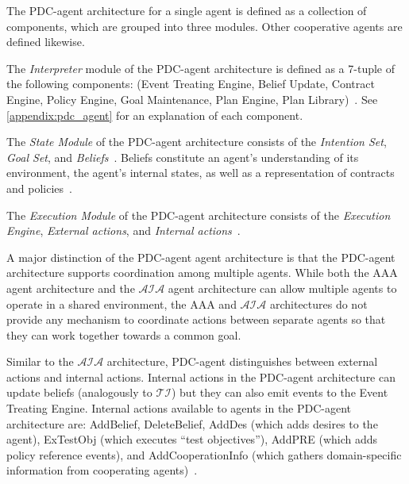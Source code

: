 \begin{definition}
    The PDC-agent architecture for a single agent is defined as a collection of components, which are grouped into three modules\footnotemark.
    Other cooperative agents are defined likewise.

\end{definition}

\begin{definition}
    The \textit{Interpreter} module of the PDC-agent architecture is defined as a 7-tuple of the following components: (Event Treating Engine, Belief Update, Contract Engine, Policy Engine, Goal Maintenance, Plan Engine, Plan Library)~\citep{liao_extended_2006}.
    See \cref{appendix:pdc_agent} for an explanation of each component.
\end{definition}

\begin{definition}
    The \textit{State Module} of the PDC-agent architecture consists of the \textit{Intention Set}, \textit{Goal Set}, and \textit{Beliefs}~\citep{liao_extended_2006}.
    Beliefs constitute an agent's understanding of its environment, the agent's internal states, as well as a representation of contracts and policies~\citep{liao_extended_2006}.
\end{definition}

\begin{definition}
    The \textit{Execution Module} of the PDC-agent architecture consists of the \textit{Execution Engine}, \textit{External actions}, and \textit{Internal actions}~\citep{liao_extended_2006}.
\end{definition}

A major distinction of the PDC-agent agent architecture is that the PDC-agent architecture supports coordination among multiple agents.
While both the AAA agent architecture and the $\mathcal{AIA}$ agent architecture can allow multiple agents to operate in a shared environment, the AAA and $\mathcal{AIA}$ architectures do not provide any mechanism to coordinate actions between separate agents so that they can work together towards a common goal.

Similar to the $\mathcal{AIA}$ architecture, PDC-agent distinguishes between external actions and internal actions.
Internal actions in the PDC-agent architecture can update beliefs (analogously to $\mathcal{TI}$) but they can also emit events to the Event Treating Engine.
Internal actions available to agents in the PDC-agent architecture are: AddBelief, DeleteBelief, AddDes (which adds desires to the agent), ExTestObj (which executes ``test objectives''), AddPRE (which adds policy reference events), and AddCooperationInfo (which gathers domain-specific information from cooperating agents)~\citep{liao_extended_2006}.

